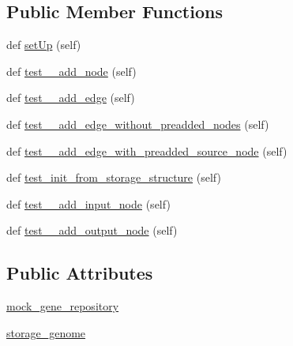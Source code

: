 \subsection*{Public Member Functions}
\begin{DoxyCompactItemize}
\item 
def \hyperlink{classNEAT__PyGenetics_1_1NEAT_1_1Tests_1_1AnalysisGenomeTests_1_1test__analysisGenome_1_1TestAnalysisGenome_a7eb8161235eddea20bc4c9663570cdac}{set\+Up} (self)
\item 
def \hyperlink{classNEAT__PyGenetics_1_1NEAT_1_1Tests_1_1AnalysisGenomeTests_1_1test__analysisGenome_1_1TestAnalysisGenome_ac95b9d78e65bf92e330d9c44ed0ef3fc}{test\+\_\+\+\_\+add\+\_\+node} (self)
\item 
def \hyperlink{classNEAT__PyGenetics_1_1NEAT_1_1Tests_1_1AnalysisGenomeTests_1_1test__analysisGenome_1_1TestAnalysisGenome_aaffe3eb85a13c66e0825223bae4ac78e}{test\+\_\+\+\_\+add\+\_\+edge} (self)
\item 
def \hyperlink{classNEAT__PyGenetics_1_1NEAT_1_1Tests_1_1AnalysisGenomeTests_1_1test__analysisGenome_1_1TestAnalysisGenome_a54eb6e20e337eeb03a7c31ee7339712f}{test\+\_\+\+\_\+add\+\_\+edge\+\_\+without\+\_\+preadded\+\_\+nodes} (self)
\item 
def \hyperlink{classNEAT__PyGenetics_1_1NEAT_1_1Tests_1_1AnalysisGenomeTests_1_1test__analysisGenome_1_1TestAnalysisGenome_a603ac3eb47164d8edb36630a92655adb}{test\+\_\+\+\_\+add\+\_\+edge\+\_\+with\+\_\+preadded\+\_\+source\+\_\+node} (self)
\item 
def \hyperlink{classNEAT__PyGenetics_1_1NEAT_1_1Tests_1_1AnalysisGenomeTests_1_1test__analysisGenome_1_1TestAnalysisGenome_a24febdb8aa6bb2efff1f6dd77b4d4393}{test\+\_\+init\+\_\+from\+\_\+storage\+\_\+structure} (self)
\item 
def \hyperlink{classNEAT__PyGenetics_1_1NEAT_1_1Tests_1_1AnalysisGenomeTests_1_1test__analysisGenome_1_1TestAnalysisGenome_ad10dfce265aa3af67fb951add1fcdd34}{test\+\_\+\+\_\+add\+\_\+input\+\_\+node} (self)
\item 
def \hyperlink{classNEAT__PyGenetics_1_1NEAT_1_1Tests_1_1AnalysisGenomeTests_1_1test__analysisGenome_1_1TestAnalysisGenome_a59b12daf2e5e073af71aa97e0bb87009}{test\+\_\+\+\_\+add\+\_\+output\+\_\+node} (self)
\end{DoxyCompactItemize}
\subsection*{Public Attributes}
\begin{DoxyCompactItemize}
\item 
\hyperlink{classNEAT__PyGenetics_1_1NEAT_1_1Tests_1_1AnalysisGenomeTests_1_1test__analysisGenome_1_1TestAnalysisGenome_a344a0b4458ba026a33e499da5ba58563}{mock\+\_\+gene\+\_\+repository}
\item 
\hyperlink{classNEAT__PyGenetics_1_1NEAT_1_1Tests_1_1AnalysisGenomeTests_1_1test__analysisGenome_1_1TestAnalysisGenome_a422f45a24e190778e830b08d527d2d66}{storage\+\_\+genome}
\end{DoxyCompactItemize}


